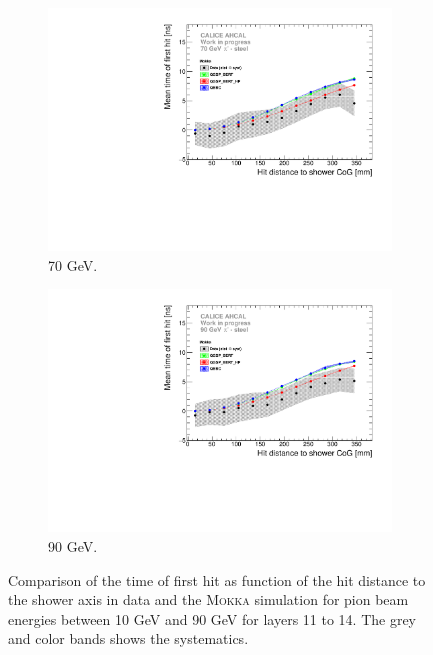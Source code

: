 \documentclass{JINST}
\newcommand\mokka{\textsc{Mokka}\xspace}
\begin{document}
\begin{figure}[htbp!]
\begin{subfigure}[t]{0.49\textwidth}
    \includegraphics[width=1\textwidth]{fig/Time_Radius_70GeV_BL_Mokka.pdf}
    \caption{70 GeV.} \label{fig:Radius_BL_SimData_70GeV}
  \end{subfigure}
  \hfill
  \begin{subfigure}[t]{0.49\textwidth}
    \centering
    \includegraphics[width=1\textwidth]{fig/Time_Radius_90GeV_BL_Mokka.pdf}
    \caption{90 GeV.} \label{fig:Radius_BL_SimData_90GeV}
  \end{subfigure}
  \caption{Comparison of the time of first hit as function of the hit distance to the shower axis in data and the \mokka simulation for pion beam energies between 10 GeV and 90 GeV for layers 11 to 14. The grey and color bands shows the systematics.}
\end{figure}
\end{document}
